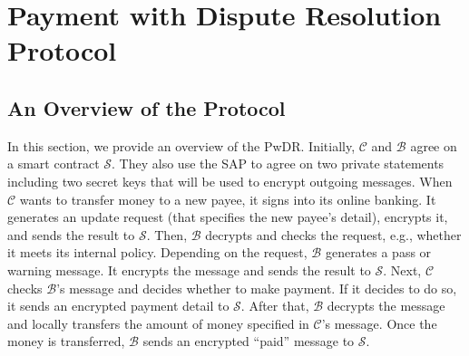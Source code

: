 






\section{Payment with Dispute Resolution Protocol}\label{sec::PwDR-Protocol}


\vspace{-.5mm}

\subsection{An Overview of  the  Protocol}
\vspace{-.5mm}

In this section, we provide an overview of the   PwDR. Initially,     $\mathcal{C}$ and   $\mathcal{B}$   agree on a smart contract  $\mathcal{S}$. They also use the SAP to agree on two private statements including two secret keys that will be used to encrypt outgoing messages. When $\mathcal{C}$ wants to transfer money to a new payee, it signs into its online banking.  It generates an update request (that specifies the new payee's detail),  encrypts it, and sends the result to  $\mathcal{S}$. Then, $\mathcal{B}$ decrypts and checks the request, e.g.,  whether it meets its internal policy. Depending on the request, $\mathcal{B}$ generates a pass or warning message. It encrypts the message and sends the result to $\mathcal{S}$. Next, $\mathcal{C}$ checks $\mathcal{B}$'s message and decides whether to make payment. If it decides to do so,  it sends an encrypted payment detail to $\mathcal{S}$. After that, $\mathcal{B}$  decrypts the message and locally transfers the amount of money specified in $\mathcal{C}$'s message. Once the money is transferred, $\mathcal{B}$ sends an encrypted  ``paid'' message to $\mathcal{S}$. 


